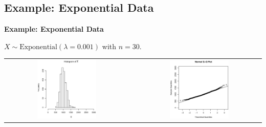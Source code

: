 \documentclass[compress]{beamer}        %
\makeatletter
\newcommand{\tcb}{\textcolor{beamer@blendedblue}}
\makeatother
\begin{document}
\subsection{Example: Exponential Data}
\begin{frame}{\bf \tcb{Example: Exponential Data}}

$X \sim \text{Exponential}(\lambda=0.001)$ with $\boxed{n=30}$.

\begin{adjustwidth}{-0.2cm}{}
\begin{tabular}{c@{}c@{}c}
\includegraphics[width=0.5\textwidth, trim = 0.0cm 0.5cm 0.3cm 0.5cm, clip]{ExpHist30}
&&
\includegraphics[width=0.5\textwidth, trim = 0.0cm 0.5cm 0.3cm 0.5cm, clip]{ExpNorm30}
\end{tabular}
\end{adjustwidth}

\end{frame}
\end{document}
